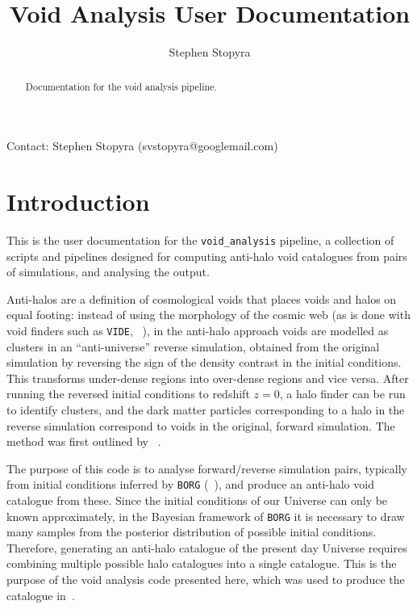 \documentclass{article}
\newcommand{\codefont}[1]{{\texttt{#1}}}
\begin{document}
	\title{Void Analysis User Documentation}
	\author{Stephen Stopyra}
	\maketitle
	\begin{abstract}
		Documentation for the void analysis pipeline.
	\end{abstract}

	Contact: Stephen Stopyra (svstopyra@googlemail.com)

	\section{Introduction}
	
	This is the user documentation for the \codefont{void\_analysis} pipeline, a collection of scripts and pipelines designed for computing anti-halo void catalogues from pairs of simulations, and analysing the output.
	
	Anti-halos are a definition of cosmological voids that places voids and halos on equal footing: instead of using the morphology of the cosmic web (as is done with void finders such as \codefont{VIDE}, ~\citet{Sutter:2014haa}), in the anti-halo approach voids are modelled as clusters in an ``anti-universe'' reverse simulation, obtained from the original simulation by reversing the sign of the density contrast in the initial conditions. This transforms under-dense regions into over-dense regions and vice versa. After running the reversed initial conditions to redshift $z = 0$, a halo finder can be run to identify clusters, and the dark matter particles corresponding to a halo in the reverse simulation correspond to voids in the original, forward simulation. The method was first outlined by ~\citet{Pontzen:2015eoh}. 
	
	The purpose of this code is to analyse forward/reverse simulation pairs, typically from initial conditions inferred by \codefont{BORG} (~\citet{jasche2019physical}), and produce an anti-halo void catalogue from these. Since the initial conditions of our Universe can only be known approximately, in the Bayesian framework of \codefont{BORG} it is necessary to draw many samples from the posterior distribution of possible initial conditions. Therefore, generating an anti-halo catalogue of the present day Universe requires combining multiple possible halo catalogues into a single catalogue. This is the purpose of the void analysis code presented here, which was used to produce the catalogue in~\citet{10.1093/mnras/stae1251}.
	
\end{document}
